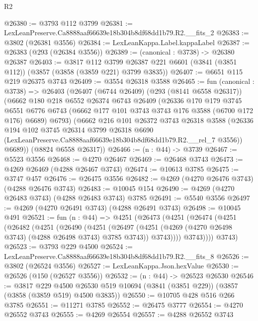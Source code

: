 \begin{lexlean}{R2}
\begin{coremodule}
@26380 := @3793 @112 @3799
@26381 := LexLeanPreserve.Ca8888aaf66639e18b304b8df68dd1b79.R2.__fits_2
@26383 := @3802 (@26381 @3556)
@26384 := LexLeanKappa.Label.kappaLabel
@26387 := @26383 (@293 (@26384 @3556))
@26389 := (canonical : @3738) -> @26380 @26387
@26403 := @3817
    @112
    @3799
    @26387
    @221
    @6601
    (@3841 (@3851 @112))
    (@3857 (@3858 (@3859 @221) @3799 @3835))
@26407 := @6651 @115 @219 @26375 @3743
@26409 := @3554 @26318 @3588
@26465 := fun (canonical : @3738) =>
  @26403
    (@26407
      (@6744 @26409)
      (@293 (@8141 @6558 @26317))
      (@6662
        @180
        @218
        @6552
        @26374
        @6743
        @26409
        (@26336
          @170
          @179
          @3745
          @6551
          @6776
          @6743
          (@6662 @177 @101 @3743 @3743 @176 @3588 (@6700 @172 @176) @6689)
          @6793)
        (@6662
          @216
          @101
          @26372
          @3743
          @26318
          @3588
          (@26336
            @194
            @102
            @3745
            @26314
            @3799
            @26318
            @6690
            (LexLeanPreserve.Ca8888aaf66639e18b304b8df68dd1b79.R2.__rel_7 @3556))
          @6689))
      (@8824 @6558 @26317))
@26466 := (n : @44) -> @3739
@26467 := @5523 @3556
@26468 := @4270 @26467
@26469 := @26468 @3743
@26473 := @4269 @26469 (@4288 @26467 @3743)
@26474 := @10613 @3785
@26475 := @3747 @457
@26476 := @26475 @3556
@26482 := @4269 (@4270 @26476 @3743) (@4288 @26476 @3743)
@26483 := @10045 @154
@26490 := @4269 (@4270 @26483 @3743) (@4288 @26483 @3743) @3785
@26491 := @5540 @3556
@26497 := @4269 (@4270 @26491 @3743) (@4288 @26491 @3743)
@26498 := @10045 @491
@26521 := fun (n : @44) =>
  @4251
    (@26473
      (@4251
        (@26474
          (@4251
            (@26482
              (@4251
                (@26490
                  (@4251
                    (@26497
                      (@4251 (@4269 (@4270 @26498 @3743) (@4288 @26498 @3743) @3785 @3743))
                      @3743))))
              @3743))))
      @3743)
@26523 := @3793 @229 @4500
@26524 := LexLeanPreserve.Ca8888aaf66639e18b304b8df68dd1b79.R2.__fits_8
@26526 := @3802 (@26524 @3556)
@26527 := LexLeanKappa.Json.hexValue
@26530 := @26526 (@150 (@26527 @3556))
@26532 := (n : @44) -> @26523 @26530
@26546 := @3817
    @229
    @4500
    @26530
    @519
    @10694
    (@3841 (@3851 @229))
    (@3857 (@3858 (@3859 @519) @4500 @3835))
@26550 := @10705 @428 @516 @266 @3785
@26551 := @11271 @3785
@26552 := @26475 @3777
@26554 := @4270 @26552 @3743
@26555 := @4269 @26554
@26557 := @4288 @26552 @3743

\end{coremodule}
\end{lexlean}
